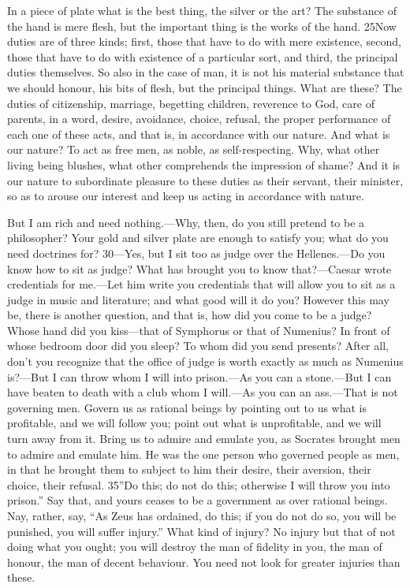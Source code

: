 In a piece of plate what is the best thing, the silver or the art? The substance of the hand is mere flesh, but the important thing is the works of the hand. 25Now duties are of three kinds; first, those that have to do with mere existence, second, those that have to do with existence of a particular sort, and third, the principal duties themselves. So also in the case of man, it is not his material substance that we should honour, his bits of flesh, but the principal things. What are these? The duties of citizenship, marriage, begetting children, reverence to God, care of parents, in a word, desire, avoidance, choice, refusal, the proper performance of each one of these acts, and that is, in accordance with our nature. And what is our nature? To act as free men, as noble, as self-respecting. Why, what other living being blushes, what other comprehends the impression of shame? And it is our nature to subordinate pleasure to these duties as their servant, their minister, so as to arouse our interest and keep us acting in accordance with nature.

But I am rich and need nothing.—Why, then, do you still pretend to be a philosopher? Your gold and silver plate are enough to satisfy you; what do you need doctrines for? 30—Yes, but I sit too as judge over the Hellenes.—Do you know how to sit as judge? What has brought you to know that?—Caesar wrote credentials for me.—Let him write you credentials that will allow you to sit as a judge in music and literature; and what good will it do you? However this may be, there is another question, and that is, how did you come to be a judge? Whose hand did you kiss—that of Symphorus or that of Numenius? In front of whose bedroom door did you sleep? To whom did you send presents? After all, don't you recognize that the office of judge is worth exactly as much as Numenius is?—But I can throw whom I will into prison.—As you can a stone.—But I can have beaten to death with a club whom I will.—As you can an ass.—That is not governing men. Govern us as rational beings by pointing out to us what is profitable, and we will follow you; point out what is unprofitable, and we will turn away from it. Bring us to admire and emulate you, as Socrates brought men to admire and emulate him. He was the one person who governed people as men, in that he brought them to subject to him their desire, their aversion, their choice, their refusal. 35''Do this; do not do this; otherwise I will throw you into prison.'' Say that, and yours ceases to be a government as over rational beings. Nay, rather, say, ``As Zeus has ordained, do this; if you do not do so, you will be punished, you will suffer injury.'' What kind of injury? No injury but that of not doing what you ought; you will destroy the man of fidelity in you, the man of honour, the man of decent behaviour. You need not look for greater injuries than these.

